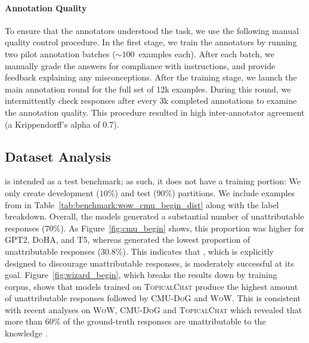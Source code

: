 \paragraph{Annotation Quality}
 To ensure that the annotators understood the task, we use the following manual quality control procedure. In the first stage, we train the annotators by running two pilot annotation batches ($\sim100$~examples each).  After each batch, we manually grade the answers for compliance with instructions, and provide feedback explaining any misconceptions.  After the training stage, we launch the main annotation round for the full set of 12k examples.  During this round, we intermittently check responses after every 3k completed annotations to examine the annotation quality. %
 This procedure resulted in high inter-annotator agreement (a Krippendorff's alpha of 0.7).


\subsection{Dataset Analysis}
\label{sec4:data_analysis}
\BEGIN{} is intended as a test benchmark; as such, it does not have a training portion: We only create development ($10\%$) and test ($90\%$) partitions. 
We include examples from \BEGIN{} in Table~\ref{tab:benchmark:wow_cmu_begin_dist} along with the label breakdown. Overall, the models generated a substantial number of unattributable responses ($70\%$). As
Figure~\ref{fig:cmu_begin} shows, this proportion was higher for \textsc{GPT2}, \textsc{DoHA}, and \textsc{T5}, whereas \CTRL{} generated the lowest proportion of unattributable responses ($30.8\%$).  This indicates that \CTRL{}, which is explicitly designed to discourage unattributable responses, is moderately successful at its goal. Figure~\ref{fig:wizard_begin}, which breaks the results down by training corpus, shows that models trained on \textsc{TopicalChat} produce the highest amount of unattributable responses followed by \textsc{CMU-DoG} and \textsc{WoW}. 
This is consistent with recent analyses on \textsc{WoW}, \textsc{CMU-DoG} and \textsc{TopicalChat} which revealed that more than 60\% of the ground-truth  responses are unattributable to the knowledge \cite{dziri2022origin,rashkin2021measuring}.

